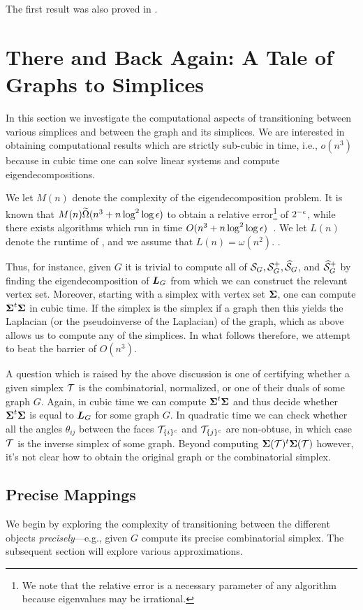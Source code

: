 The first result was also proved in \cite{kaibel2008complexity}. 


\section{There and Back Again: A Tale of Graphs to Simplices}
In this section we investigate the computational aspects of transitioning between various simplices and between the graph and its simplices. We are interested in obtaining computational results which are strictly sub-cubic in time, i.e., $o(n^3)$ because in cubic time one can solve linear systems and compute eigendecompositions. 


We let $M(n)$ denote the complexity of the eigendecomposition problem. It is known that  $M(n)\widetilde{\Omega}(n^3 + n\log^2 \log \epsilon)$ to obtain a relative error\footnote{We note that the relative error is a necessary parameter of any algorithm because eigenvalues may be irrational.} of $2^{-\epsilon}$, while there exists algorithms which run in time $O(n^3 + n\log^2 \log \epsilon)$~\cite{pan1999complexity}. 
We let $L(n)$ denote the runtime of \lapdecomp, and we assume that $L(n) =\omega(n^2)$. . 

 Thus, for instance, given $G$ it is trivial to compute all of $\mathcal{S}_G,\mathcal{S}^+_G,\widehat{\mathcal{S}}_G$, and $\widehat{\mathcal{S}}_G^+$ by finding the eigendecomposition of $\vb*{L}_G$ from which we can construct the relevant vertex set.  Moreover, starting with a simplex with vertex set $\boldsymbol{\Sigma}$, one can compute $\boldsymbol{\Sigma}^t\boldsymbol{\Sigma}$ in cubic time. If the simplex is the simplex if a graph then this yields the Laplacian (or the pseudoinverse of the Laplacian) of the graph, which as above allows us to compute any of the simplices. In what follows therefore, we attempt to beat the barrier of $O(n^3)$. 

A question which is raised by the above discussion is one of certifying whether a given simplex $\mathcal{T}$ is the combinatorial, normalized, or one of their duals of some graph $G$. Again, in cubic time we can compute $\boldsymbol{\Sigma}^t\boldsymbol{\Sigma}$ and thus decide whether $\boldsymbol{\Sigma}^t\boldsymbol{\Sigma}$ is equal to $\vb*{L}_G$ for some graph $G$. In quadratic time we can check whether all the angles $\theta_{ij}$ between the faces $\mathcal{T}_{\{i\}^c}$ and $\mathcal{T}_{\{j\}^c}$ are non-obtuse, in which case $\mathcal{T}$ is the inverse simplex of some graph. Beyond computing $\boldsymbol{\Sigma}(\mathcal{T})^t \boldsymbol{\Sigma}(\mathcal{T})$ however, it's not clear how to obtain the original graph or the combinatorial simplex. 

\subsection{Precise Mappings}
We begin by exploring the complexity of transitioning between the different objects \emph{precisely}---e.g., given $G$ compute its precise combinatorial simplex. The subsequent  section will explore various approximations. 

